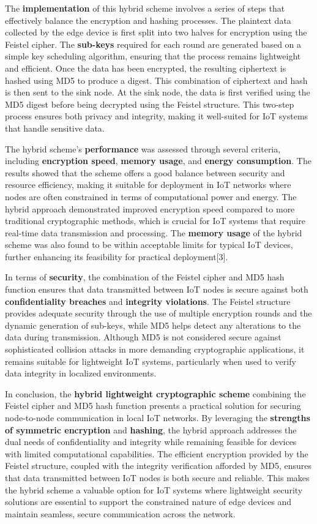 \documentclass{article}
\begin{document}
The \textbf{implementation} of this hybrid scheme involves a series of steps that effectively balance the encryption and hashing processes. The plaintext data collected by the edge device is first split into two halves for encryption using the Feistel cipher. The \textbf{sub-keys} required for each round are generated based on a simple key scheduling algorithm, ensuring that the process remains lightweight and efficient. Once the data has been encrypted, the resulting ciphertext is hashed using MD5 to produce a digest. This combination of ciphertext and hash is then sent to the sink node. At the sink node, the data is first verified using the MD5 digest before being decrypted using the Feistel structure. This two-step process ensures both privacy and integrity, making it well-suited for IoT systems that handle sensitive data.

The hybrid scheme's \textbf{performance} was assessed through several criteria, including \textbf{encryption speed}, \textbf{memory usage}, and \textbf{energy consumption}. The results showed that the scheme offers a good balance between security and resource efficiency, making it suitable for deployment in IoT networks where nodes are often constrained in terms of computational power and energy. The hybrid approach demonstrated improved encryption speed compared to more traditional cryptographic methods, which is crucial for IoT systems that require real-time data transmission and processing. The \textbf{memory usage} of the hybrid scheme was also found to be within acceptable limits for typical IoT devices, further enhancing its feasibility for practical deployment[3].

In terms of \textbf{security}, the combination of the Feistel cipher and MD5 hash function ensures that data transmitted between IoT nodes is secure against both \textbf{confidentiality breaches} and \textbf{integrity violations}. The Feistel structure provides adequate security through the use of multiple encryption rounds and the dynamic generation of sub-keys, while MD5 helps detect any alterations to the data during transmission. Although MD5 is not considered secure against sophisticated collision attacks in more demanding cryptographic applications, it remains suitable for lightweight IoT systems, particularly when used to verify data integrity in localized environments.

In conclusion, the \textbf{hybrid lightweight cryptographic scheme} combining the Feistel cipher and MD5 hash function presents a practical solution for securing node-to-node communication in local IoT networks. By leveraging the \textbf{strengths of symmetric encryption} and \textbf{hashing}, the hybrid approach addresses the dual needs of confidentiality and integrity while remaining feasible for devices with limited computational capabilities. The efficient encryption provided by the Feistel structure, coupled with the integrity verification afforded by MD5, ensures that data transmitted between IoT nodes is both secure and reliable. This makes the hybrid scheme a valuable option for IoT systems where lightweight security solutions are essential to support the constrained nature of edge devices and maintain seamless, secure communication across the network.
\end{document}
